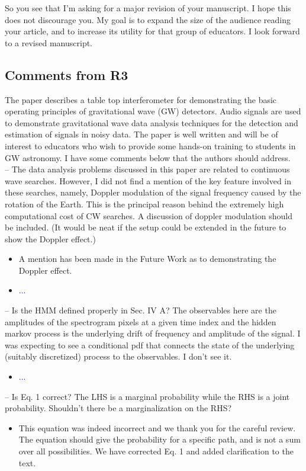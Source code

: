 \documentclass{article}
\newcommand{\todo}{\textcolor{blue}}
\begin{document}
\noindent So you see that I’m asking for a major revision of your manuscript.  I hope this does not discourage you.  My goal is to expand the size of the audience reading your article, and to increase its utility for that group of educators.  I look forward to a revised manuscript.



\subsection*{Comments from R3}


The paper describes a table top interferometer for demonstrating the basic operating principles of gravitational wave (GW) detectors. Audio signals are used to demonstrate gravitational wave data analysis techniques for the detection and estimation of signals in noisy data. The paper is well written and will be of interest to educators who wish to provide some hands-on training to students in GW astronomy. I have some comments below that the authors should address.\\

\noindent 
-- The data analysis problems discussed in this paper are related to continuous wave searches. However, I did not find a mention of the key feature involved in these searches, namely, Doppler modulation of the signal frequency caused by the rotation of the Earth. This is the principal reason behind the extremely high computational cost of CW searches. A discussion of doppler modulation should be included. (It would be neat if the setup could be extended in the future to show the Doppler effect.)
\begin{itemize}
\item A mention has been made in the Future Work as to demonstrating the Doppler effect.
\item \todo{...}
\end{itemize}

\noindent
-- Is the HMM defined properly in Sec. IV A? The observables here are the amplitudes of the spectrogram pixels at a given time index and the hidden markov process is the underlying drift of frequency and amplitude of the signal. I was expecting to see a conditional pdf that connects the state of the underlying (suitably discretized) process to the observables. I don't see it.
\begin{itemize}
\item \todo{...}
\end{itemize}

\noindent
-- Is Eq. 1 correct? The LHS is a marginal probability while the RHS is a joint probability. Shouldn't there be a marginalization on the RHS?
\begin{itemize}
\item This equation was indeed incorrect and we thank you for the careful review. The equation should give the probability for a specific path, and is not a sum over all possibilities. We have corrected Eq. 1 and added clarification to the text. 
\end{itemize}
\end{document}
